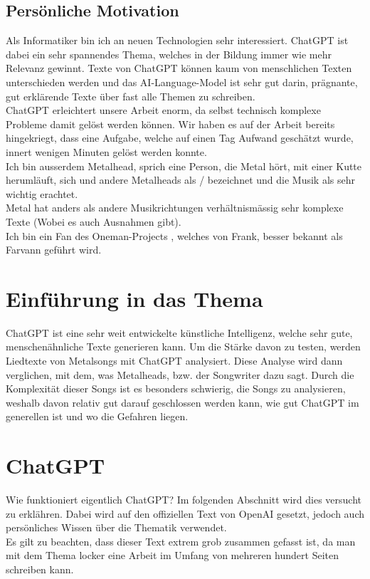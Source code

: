 \documentclass[twocolumn,10pt]{article}
\begin{document}
		\subsection{Persönliche Motivation}
		Als Informatiker bin ich an neuen Technologien sehr interessiert. ChatGPT ist dabei ein sehr spannendes Thema, welches in der Bildung immer wie mehr Relevanz gewinnt. Texte von ChatGPT können kaum von menschlichen Texten unterschieden werden und das AI-Language-Model ist sehr gut darin, prägnante, gut erklärende Texte über fast alle Themen zu schreiben.\\
		ChatGPT erleichtert unsere Arbeit enorm, da selbst technisch komplexe Probleme damit gelöst werden können. Wir haben es auf der Arbeit bereits hingekriegt, dass eine Aufgabe, welche auf einen Tag Aufwand geschätzt wurde, innert wenigen Minuten gelöst werden konnte.\\
		Ich bin ausserdem Metalhead, sprich eine Person, die Metal hört, mit einer Kutte herumläuft, sich und andere Metalheads als  /  bezeichnet und die Musik als sehr wichtig erachtet.\\ 
		Metal hat anders als andere Musikrichtungen verhältnismässig sehr komplexe Texte (Wobei es auch Ausnahmen gibt).\\ 
		Ich bin ein Fan des Oneman-Projects , welches von Frank, besser bekannt als Farvann geführt wird.  
	\clearpage
	\section{Einführung in das Thema}
	ChatGPT\cite{ChatGPT} ist eine sehr weit entwickelte künstliche Intelligenz, welche sehr gute, menschenähnliche Texte generieren kann. Um die Stärke davon zu testen, werden Liedtexte von Metalsongs mit ChatGPT analysiert. Diese Analyse wird dann verglichen, mit dem, was Metalheads, bzw. der Songwriter dazu sagt. Durch die Komplexität dieser Songs ist es besonders schwierig, die Songs zu analysieren, weshalb davon relativ gut darauf geschlossen werden kann, wie gut ChatGPT im generellen ist und wo die Gefahren liegen.
	
	\pagebreak
	\section{ChatGPT}
	Wie funktioniert eigentlich ChatGPT\cite{ChatGPT}? Im folgenden Abschnitt wird dies versucht zu erklähren. Dabei wird auf den offiziellen Text von OpenAI\cite{openai_2022} gesetzt, jedoch auch persönliches Wissen über die Thematik verwendet.\\
	Es gilt zu beachten, dass dieser Text extrem grob zusammen gefasst ist, da man mit dem Thema locker eine Arbeit im Umfang von mehreren hundert Seiten schreiben kann.
\end{document}
